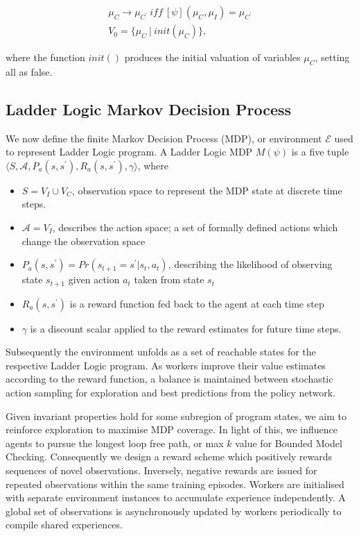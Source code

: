 \documentclass[conference,compsoc]{IEEEtran}
\begin{document}
\begin{align}
	\mu_C \to \mu_{C^\prime} \ \textit{iff} \ [\psi](\mu_C,\mu_I)=\mu_{C^\prime} \\
	V_0 = \{\mu_C \ | \ init(\mu_C)\},
\end{align}

where the function $init()$ produces the initial valuation of variables $\mu_C$, setting all as false.\\

\subsection{Ladder Logic Markov Decision Process}
We now define the finite Markov Decision Process (MDP), or environment $\mathcal{E}$ used to represent Ladder Logic program. A Ladder Logic MDP $M(\psi)$ is a five tuple $\langle S,\mathcal{A},P_a(s,s^\prime), R_a(s,s^\prime),\gamma \rangle$, where 
\begin{itemize}
	\item $S = V_I \cup V_C$, observation space to represent the MDP state at discrete time steps.
	\item $\mathcal{A} = V_I$, describes the action space; a set of formally defined actions which change the observation space
	\item $P_a(s,s^\prime) = Pr(s_{t+1} = s^\prime | s_t, a_t)$, describing the likelihood of observing state $s_{t+1}$ given action $a_t$ taken from state $s_t$
	\item $R_a(s,s^\prime)$ is a reward function fed back to the agent at each time step
	\item $\gamma$ is a discount scalar applied to the reward estimates for future time steps.
\end{itemize}

Subsequently the environment unfolds as a set of reachable states for the respective Ladder Logic program. As workers improve their value estimates according to the reward function, a balance is maintained between stochastic action sampling for exploration and best predictions from the policy network.

Given invariant properties hold for some subregion of program states, we aim to reinforce exploration to maximise MDP coverage. In light of this, we influence agents to pursue the longest loop free path, or max $k$ value for Bounded Model Checking. Consequently we design a reward scheme which positively rewards sequences of novel observations. Inversely, negative rewards are issued for repeated observations within the same training episodes. Workers are initialised with separate environment instances to accumulate experience independently. A global set of observations is asynchronously updated by workers periodically to compile shared experiences.    
\end{document}
